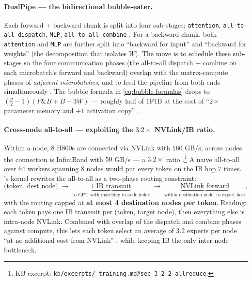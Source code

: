 \paragraph{DualPipe --- the bidirectional bubble-eater.} Each forward
+ backward chunk is split into four sub-stages: \texttt{attention},
\texttt{all-to-all dispatch}, \texttt{MLP}, \texttt{all-to-all
combine} \citep[\S 3.2.1]{deepseek-v3}. For a backward chunk, both
\texttt{attention} and \texttt{MLP} are further split into ``backward
for input'' and ``backward for weights'' (the  decomposition
that isolates $W$). The   move is to schedule these
sub-stages so the four communication phases (the all-to-all dispatch +
combine on each microbatch's forward and backward) overlap with the
matrix-compute phases of \emph{adjacent microbatches}, and to feed the
pipeline from both ends simultaneously \citep[\S 3.2.1]{deepseek-v3}.
The bubble formula in \cref{eq:bubble-formulas} drops to
$(\tfrac{p}{2} - 1)(F\mathbin{\text{\&}}B + B - 3W)$ --- roughly half of 1F1B at the
cost of ``$2\times$ parameter memory and $+1$ activation copy''
\citep[\S 3.2.1]{deepseek-v3}.

\paragraph{Cross-node all-to-all --- exploiting the $3.2\times$
NVLink/IB ratio.} Within a node, $8$ H800s are connected via NVLink
with $160$ GB/s; across nodes the connection is InfiniBand with
$50$ GB/s --- a $3.2\times$ ratio
\citep[\S 3.2.2]{deepseek-v3}.\footnote{KB excerpt:
\texttt{kb/excerpts/-training.md\#sec-3-2-2-allreduce}.} A
naive  all-to-all over $64$ workers spanning $8$ nodes would put
every token on the IB hop $7$ times. 's kernel rewrites the
all-to-all as a two-phase routing constraint:
\begin{equation}
\text{(token, dest node)} \;\to\; \underbrace{1\;\text{IB transmit}}_{\text{to GPU with matching in-node index}}
\;\to\; \underbrace{\text{NVLink forward}}_{\text{within destination node, to expert host}},
\label{eq:dsv3-routing}
\end{equation}
with the routing capped at \textbf{at most 4 destination nodes per
token}. Reading: each token pays one IB transmit per (token, target
node), then everything else is intra-node NVLink. Combined with
 overlap of the dispatch and combine phases against compute,
this lets each token select an average of $3.2$ experts per node ``at
no additional cost from NVLink'' \citep[\S 3.2.2]{deepseek-v3}, while
keeping IB the only inter-node bottleneck.

